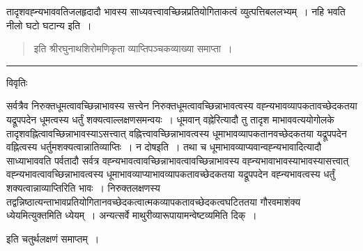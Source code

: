 \documentclass[10pt, openany]{book}
\begin{document}
{तादृशवह्न्यभाववतिजलहृदादौ
\newpage
\noindent
{\la भावस्य साध्यवत्त्वावच्छिन्नप्रतियोगिताकत्वं व्युत्पत्तिबललभ्यम्~। नहि भवति नीलो घटो घटान्य इति~।}
\begin{quote}
\vpc
इति श्रीरघुनाथशिरोमणिकृता व्याप्तिपञ्चकव्याख्या समाप्ता~।
\end{quote}
\hrule
\begin{center}     विवृतिः \end{center}
सर्वत्रैव निरुक्तधूमत्वावच्छिन्नाभावस्य सत्त्वेन निरुक्तधूमत्वावच्छिन्नाभावत्वस्य वह्न्यभावव्यापकतावच्छेदकतया यद्रूपपदेन धूमत्वस्य धर्तुं शक्यत्वाल्लक्षणसमन्वयः~। धूमवान् वह्नेरित्यादौ तु तादृश   माभाववत्ययोगोलके तादृशवह्नित्वावच्छिन्नाभावस्याऽसत्त्वात् वह्नित्त्वावच्छिन्नाभावत्वस्य धूमाभावव्यापकतानवच्छेदकतया यद्रूपपदेन वह्नित्वस्य धर्तुमशक्यत्वान्नातिव्याप्तिः~। न दोषइति~। तथा च धूमाभावव्याप्यवान्\textendash वह्न्यभावादित्यादौ साध्याभाववति पर्वतादौ सर्वत्र वह्न्यभावत्वावच्छिन्नाभावत्वावच्छिन्नाभावस्य वह्न्यभावाभावस्याभावस्यासत्त्वात् वह्न्यभावत्वावच्छिन्नाभावत्वस्य धूमाभावव्याप्याभावव्यापकतावच्छेदकतया यद्रूपपदेन वह्न्यभावत्वस्य धर्तुं शक्यत्वान्नाव्याप्तिरिति भावः~। निरुक्तलक्षणस्य तद्वन्निष्ठात्यन्ताभावप्रतियोगितानवच्छेदकत्वात्मकव्यापकतावच्छेदकत्वघटिततया गौरवमाशंक्य ध्येयमित्युक्तमिति ध्येयम्~। अन्यत्सर्वे माथुरीव्यारूपायामन्वेष्टव्यमिति दिक्~।
\begin{center}
इति चतुर्थलक्षणं समाप्तम्~।  
\end{center}

}
\end{document}
